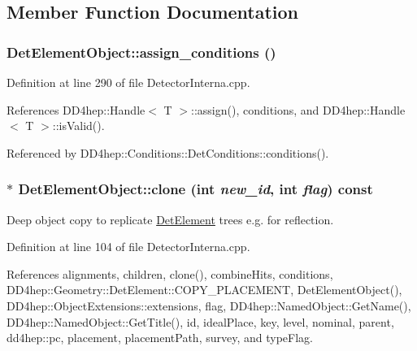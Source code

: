 \subsection{Member Function Documentation}
\hypertarget{class_d_d4hep_1_1_geometry_1_1_det_element_object_af14fab1a6caabaad84336f6312ae5617}{
\subsubsection[{assign\_\-conditions}]{ DetElementObject::assign\_\-conditions ()}}
\label{class_d_d4hep_1_1_geometry_1_1_det_element_object_af14fab1a6caabaad84336f6312ae5617}


Definition at line 290 of file DetectorInterna.cpp.

References DD4hep::Handle$<$ T $>$::assign(), conditions, and DD4hep::Handle$<$ T $>$::isValid().

Referenced by DD4hep::Conditions::DetConditions::conditions().\hypertarget{class_d_d4hep_1_1_geometry_1_1_det_element_object_a77b1295a6b9df6064c23376f4d4e8869}{
\subsubsection[{clone}]{ $\ast$ DetElementObject::clone (int {\em new\_\-id}, \/  int {\em flag}) const}}
\label{class_d_d4hep_1_1_geometry_1_1_det_element_object_a77b1295a6b9df6064c23376f4d4e8869}


Deep object copy to replicate \hyperlink{class_d_d4hep_1_1_geometry_1_1_det_element}{DetElement} trees e.g. for reflection. 

Definition at line 104 of file DetectorInterna.cpp.

References alignments, children, clone(), combineHits, conditions, DD4hep::Geometry::DetElement::COPY\_\-PLACEMENT, DetElementObject(), DD4hep::ObjectExtensions::extensions, flag, DD4hep::NamedObject::GetName(), DD4hep::NamedObject::GetTitle(), id, idealPlace, key, level, nominal, parent, dd4hep::pc, placement, placementPath, survey, and typeFlag.

